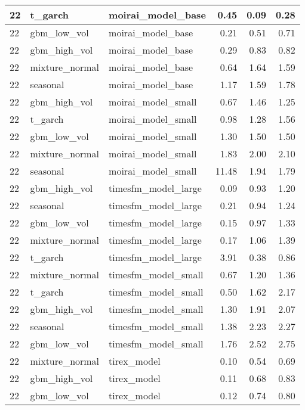 {\begin{tabular}{lllrrr}
\midrule
22 & t\_garch & moirai\_model\_base & 0.45 & 0.09 & 0.28 \\
\midrule
22 & gbm\_low\_vol & moirai\_model\_base & 0.21 & 0.51 & 0.71 \\
\midrule
22 & gbm\_high\_vol & moirai\_model\_base & 0.29 & 0.83 & 0.82 \\
\midrule
22 & mixture\_normal & moirai\_model\_base & 0.64 & 1.64 & 1.59 \\
\midrule
22 & seasonal & moirai\_model\_base & 1.17 & 1.59 & 1.78 \\
\midrule
22 & gbm\_high\_vol & moirai\_model\_small & 0.67 & 1.46 & 1.25 \\
\midrule
22 & t\_garch & moirai\_model\_small & 0.98 & 1.28 & 1.56 \\
\midrule
22 & gbm\_low\_vol & moirai\_model\_small & 1.30 & 1.50 & 1.50 \\
\midrule
22 & mixture\_normal & moirai\_model\_small & 1.83 & 2.00 & 2.10 \\
\midrule
22 & seasonal & moirai\_model\_small & 11.48 & 1.94 & 1.79 \\
\midrule
22 & gbm\_high\_vol & timesfm\_model\_large & 0.09 & 0.93 & 1.20 \\
\midrule
22 & seasonal & timesfm\_model\_large & 0.21 & 0.94 & 1.24 \\
\midrule
22 & gbm\_low\_vol & timesfm\_model\_large & 0.15 & 0.97 & 1.33 \\
\midrule
22 & mixture\_normal & timesfm\_model\_large & 0.17 & 1.06 & 1.39 \\
\midrule
22 & t\_garch & timesfm\_model\_large & 3.91 & 0.38 & 0.86 \\
\midrule
22 & mixture\_normal & timesfm\_model\_small & 0.67 & 1.20 & 1.36 \\
\midrule
22 & t\_garch & timesfm\_model\_small & 0.50 & 1.62 & 2.17 \\
\midrule
22 & gbm\_high\_vol & timesfm\_model\_small & 1.30 & 1.91 & 2.07 \\
\midrule
22 & seasonal & timesfm\_model\_small & 1.38 & 2.23 & 2.27 \\
\midrule
22 & gbm\_low\_vol & timesfm\_model\_small & 1.76 & 2.52 & 2.75 \\
\midrule
22 & mixture\_normal & tirex\_model & 0.10 & 0.54 & 0.69 \\
\midrule
22 & gbm\_high\_vol & tirex\_model & 0.11 & 0.68 & 0.83 \\
\midrule
22 & gbm\_low\_vol & tirex\_model & 0.12 & 0.74 & 0.80 \\

\end{tabular}}
